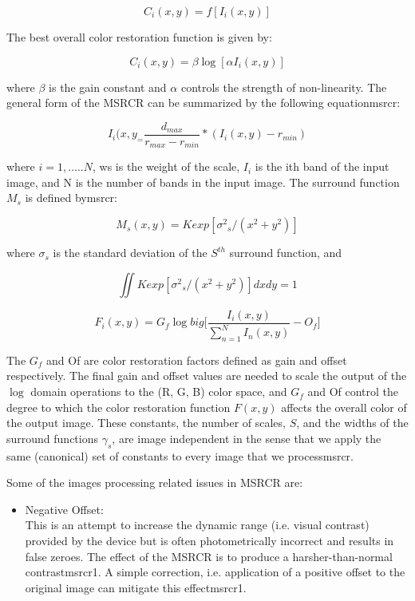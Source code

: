 \begin{equation}
	C_{i}(x,y)=f[I_{i}(x,y)]
\end{equation}

The best overall color restoration function is given by:

\begin{equation}
	C_{i}(x,y)=\beta \log[\alpha I_{i}(x,y)]
\end{equation}

where $\beta$ is the gain constant and $\alpha$ controls the strength of
non-linearity.
The general form of the MSRCR can be summarized by
the following equation{msrcr}:

\begin{equation}
	I_{i}(x,y_=\frac{d_{max}}{r_{max}-r_{min}}*(I_{i}(x,y)-r_{min})
\end{equation}

where $i =1, ….. N$, ws is the weight of the scale, $I_{i}$ is the
ith band of the input image, and N is the number of bands
in the input image. The surround function $M_{s}$ is defined
by{msrcr}:

\begin{equation}
	M_{s}(x,y)=K exp[{\sigma^{2}}_{s}/(x^{2}+y^{2})]
\end{equation}

where $\sigma_{s}$ is the standard deviation of the $S^{th}$ surround
function, and

\begin{equation}
	\iint K exp[{\sigma^{2}}_{s}/(x^{2}+y^{2})]dx dy =1
\end{equation}

\begin{equation}
	F_{i}(x,y)=G_{f} \log big[\frac{I_{i}(x,y)}{\sum_{n=1}^N I_{n}(x,y)}-O_{f}\big]
\end{equation}

The $G_{f}$ and Of are color restoration factors defined as
gain and offset respectively. The final gain and offset
values are needed to scale the output of the $\log$ domain
operations to the (R, G, B) color space, and $G_{f}$ and Of
control the degree to which the color restoration function
$F(x,y)$ affects the overall color of the output image. These
constants, the number of scales, $S$, and the widths of the
surround functions $\gamma_{s}$, are image independent in the sense
that we apply the same (canonical) set of constants to
every image that we process{msrcr}.

Some of the images processing related issues in MSRCR
are:
\begin{itemize}
	\item Negative Offset:\\
	This is an attempt to increase the dynamic range (i.e.
visual contrast) provided by the device but is often
photometrically incorrect and results in false zeroes. The
effect of the MSRCR is to produce a harsher-than-normal
contrast{msrcr1}. A simple correction, i.e. application of a
positive offset to the original image can mitigate this
effect{msrcr1}.

\end{itemize}

